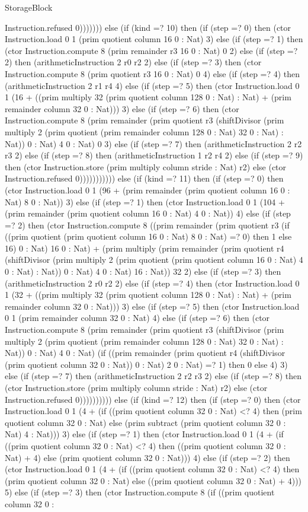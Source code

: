 \begin{lexlean}{StorageBlock}
\begin{semanticmodule}
{Instruction.refused 0))))))) else (if (kind =? 10) then (if (step =? 0) then (ctor Instruction.load 0 1 (prim quotient column 16 0 : Nat) 3) else (if (step =? 1) then (ctor Instruction.compute 8 (prim remainder r3 16 0 : Nat) 0 2) else (if (step =? 2) then (arithmeticInstruction 2 r0 r2 2) else (if (step =? 3) then (ctor Instruction.compute 8 (prim quotient r3 16 0 : Nat) 0 4) else (if (step =? 4) then (arithmeticInstruction 2 r1 r4 4) else (if (step =? 5) then (ctor Instruction.load 0 1 (16 + ((prim multiply 32 (prim quotient column 128 0 : Nat) : Nat) + (prim remainder column 32 0 : Nat))) 3) else (if (step =? 6) then (ctor Instruction.compute 8 (prim remainder (prim quotient r3 (shiftDivisor (prim multiply 2 (prim quotient (prim remainder column 128 0 : Nat) 32 0 : Nat) : Nat)) 0 : Nat) 4 0 : Nat) 0 3) else (if (step =? 7) then (arithmeticInstruction 2 r2 r3 2) else (if (step =? 8) then (arithmeticInstruction 1 r2 r4 2) else (if (step =? 9) then (ctor Instruction.store (prim multiply column stride : Nat) r2) else (ctor Instruction.refused 0))))))))))) else (if (kind =? 11) then (if (step =? 0) then (ctor Instruction.load 0 1 (96 + (prim remainder (prim quotient column 16 0 : Nat) 8 0 : Nat)) 3) else (if (step =? 1) then (ctor Instruction.load 0 1 (104 + (prim remainder (prim quotient column 16 0 : Nat) 4 0 : Nat)) 4) else (if (step =? 2) then (ctor Instruction.compute 8 ((prim remainder (prim quotient r3 (if ((prim quotient (prim quotient column 16 0 : Nat) 8 0 : Nat) =? 0) then 1 else 16) 0 : Nat) 16 0 : Nat) + (prim multiply (prim remainder (prim quotient r4 (shiftDivisor (prim multiply 2 (prim quotient (prim quotient column 16 0 : Nat) 4 0 : Nat) : Nat)) 0 : Nat) 4 0 : Nat) 16 : Nat)) 32 2) else (if (step =? 3) then (arithmeticInstruction 2 r0 r2 2) else (if (step =? 4) then (ctor Instruction.load 0 1 (32 + ((prim multiply 32 (prim quotient column 128 0 : Nat) : Nat) + (prim remainder column 32 0 : Nat))) 3) else (if (step =? 5) then (ctor Instruction.load 0 1 (prim remainder column 32 0 : Nat) 4) else (if (step =? 6) then (ctor Instruction.compute 8 (prim remainder (prim quotient r3 (shiftDivisor (prim multiply 2 (prim quotient (prim remainder column 128 0 : Nat) 32 0 : Nat) : Nat)) 0 : Nat) 4 0 : Nat) (if ((prim remainder (prim quotient r4 (shiftDivisor (prim quotient column 32 0 : Nat)) 0 : Nat) 2 0 : Nat) =? 1) then 0 else 4) 3) else (if (step =? 7) then (arithmeticInstruction 2 r2 r3 2) else (if (step =? 8) then (ctor Instruction.store (prim multiply column stride : Nat) r2) else (ctor Instruction.refused 0)))))))))) else (if (kind =? 12) then (if (step =? 0) then (ctor Instruction.load 0 1 (4 + (if ((prim quotient column 32 0 : Nat) <? 4) then (prim quotient column 32 0 : Nat) else (prim subtract (prim quotient column 32 0 : Nat) 4 : Nat))) 3) else (if (step =? 1) then (ctor Instruction.load 0 1 (4 + (if ((prim quotient column 32 0 : Nat) <? 4) then ((prim quotient column 32 0 : Nat) + 4) else (prim quotient column 32 0 : Nat))) 4) else (if (step =? 2) then (ctor Instruction.load 0 1 (4 + (if ((prim quotient column 32 0 : Nat) <? 4) then (prim quotient column 32 0 : Nat) else ((prim quotient column 32 0 : Nat) + 4))) 5) else (if (step =? 3) then (ctor Instruction.compute 8 (if ((prim quotient column 32 0 : }
\end{semanticmodule}
\end{lexlean}
